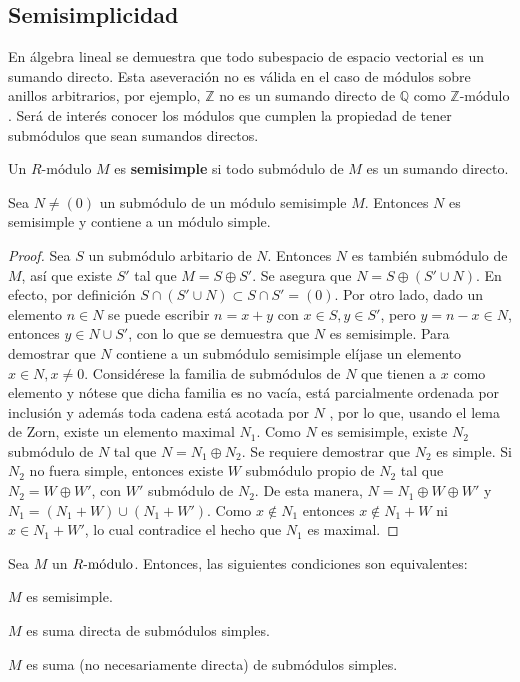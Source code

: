 \subsection{Semisimplicidad}
En álgebra lineal se demuestra que todo subespacio de espacio vectorial es un sumando directo. Esta aseveración no es válida en el caso de módulos sobre anillos arbitrarios, por ejemplo, $\mathds{Z}$ no es un sumando directo de $\mathds{Q}$ como $\mathds{Z}\mbox{-módulo}$. Será de interés conocer los módulos que cumplen la propiedad de tener submódulos que sean sumandos directos. 
\begin{definicion}
Un $R\mbox{-módulo}$ $M$ es \textbf{semisimple} si todo submódulo de $M$ es un sumando directo. 
\end{definicion}  
\begin{proposicion}
Sea $N \neq (0)$ un submódulo de un módulo semisimple $M$. Entonces $N$ es semisimple y contiene a un módulo simple.
\end{proposicion}
\begin{proof}
Sea $S$ un submódulo arbitario de $N$. Entonces $N$ es también submódulo de $M$, así que existe $S'$ tal que $M = S \oplus S'$. Se asegura que $N = S \oplus (S'\cup N)$. En efecto, por definición $S \cap (S'\cup N) \subset S\cap S' = (0)$. Por otro lado, dado un elemento $n \in N$ se puede escribir $n = x + y$ con $x \in S, y \in S'$, pero $y = n - x \in N$, entonces $y \in N \cup S'$, con lo que se demuestra que $N$ es semisimple. 
Para demostrar que $N$ contiene a un submódulo semisimple elíjase un elemento $x \in N, x \neq 0$. Considérese la familia de submódulos de $N$ que tienen a $x$ como elemento y nótese que dicha familia es no vacía, está parcialmente ordenada por inclusión y además toda cadena está acotada por $N$ , por lo que, usando el lema de Zorn, existe un elemento maximal $N_1$. Como $N$ es semisimple, existe $N_2$ submódulo de $N$ tal que $N = N_1 \oplus N_2$. Se requiere demostrar que $N_2$ es simple.
Si $N_2$ no fuera simple, entonces existe $W$ submódulo propio de $N_2$ tal que $N_2 = W \oplus W'$, con $W'$ submódulo de $N_2$. De esta manera, $N = N_1 \oplus W \oplus W'$ y $N_1 = (N_1 + W)\cup(N_1 + W')$. Como $x \notin N_1$ entonces $x \notin N_1 + W$ ni $x \in N_1 + W'$, lo cual contradice el hecho que $N_1$ es maximal.   
\end{proof}
\begin{teorema}\label{teo:caracSemi}
Sea $M$ un $\modulo{R}$. Entonces, las siguientes condiciones son equivalentes:
\begin{bulletList}
\item\label{item:ssimple1} $M$ es semisimple.
\item\label{item:ssimple2} $M$ es suma directa de submódulos simples.
\item\label{item:ssimple3} $M$ es suma (no necesariamente directa) de submódulos simples.
\end{bulletList}
\end{teorema}
